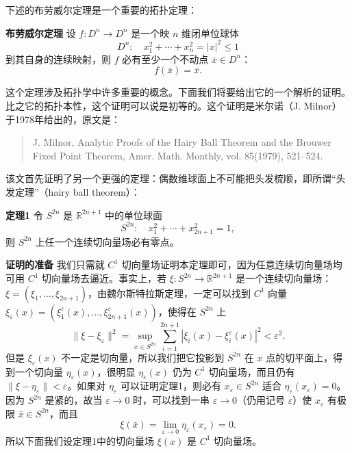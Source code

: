 下述的布劳威尔定理是一个重要的拓扑定理：

\noindent\textbf{布劳威尔定理}\quad
设 $f:D^n\to D^n$ 是一个映 $n$ 维闭单位球体
\begin{equation}
 D^n:\quad x_1^2+\cdots+x_n^2=|x|^2\le1
 \tag{1}
\end{equation}
到其自身的连续映射，则 $f$ 必有至少一个不动点 $\bar x\in D^n$：
\[
 f(\bar x)=\bar x.
\]

这个定理涉及拓扑学中许多重要的概念。下面我们将要给出它的一个解析的证明。比之它的拓扑本性，这个证明可以说是初等的。这个证明是米尔诺（J. Milnor）于1978年给出的，原文是：

\begin{quote}\small
J. Milnor, Analytic Proofs of the Hairy Ball Theorem and the Brouwer Fixed Point Theorem, Amer. Math. Monthly, vol. 85(1979), 521--524.
\end{quote}

该文首先证明了另一个更强的定理：偶数维球面上不可能把头发梳顺，即所谓“头发定理”（hairy ball theorem）：

\noindent\textbf{定理1}\quad
令 $S^{2n}$ 是 $\mathbb R^{2n+1}$ 中的单位球面
\begin{equation}
 S^{2n}:\quad x_1^2+\cdots+x_{2n+1}^2=1,
 \tag{2}
\end{equation}
则 $S^{2n}$ 上任一个连续切向量场必有零点。

\noindent\textbf{证明的准备}\quad
我们只需就 $C^1$ 切向量场证明本定理即可，因为任意连续切向量场均可用 $C^1$ 切向量场去逼近。事实上，若 $\xi:S^{2n}\to\mathbb R^{2n+1}$ 是一个连续切向量场：$\xi=(\xi_1,\ldots,\xi_{2n+1})$，由魏尔斯特拉斯定理，一定可以找到 $C^1$ 向量 $\xi_\varepsilon(x)=(\xi_1^\varepsilon(x),\ldots,\xi_{2n+1}^\varepsilon(x))$，使得在 $S^{2n}$ 上
\[
 \|\xi-\xi_\varepsilon\|^2=
 \sup_{x\in S^{2n}}\sum_{i=1}^{2n+1}|\xi_i(x)-\xi_i^\varepsilon(x)|^2<\varepsilon^2.
\]
但是 $\xi_\varepsilon(x)$ 不一定是切向量，所以我们把它投影到 $S^{2n}$ 在 $x$ 点的切平面上，得到一个切向量 $\eta_\varepsilon(x)$，很明显 $\eta_\varepsilon(x)$ 仍为 $C^1$ 切向量场，而且仍有 $\|\xi-\eta_\varepsilon\|<\varepsilon$。如果对 $\eta_\varepsilon$ 可以证明定理1，则必有 $x_\varepsilon\in S^{2n}$ 适合 $\eta_\varepsilon(x_\varepsilon)=0$。因为 $S^{2n}$ 是紧的，故当 $\varepsilon\to0$ 时，可以找到一串 $\varepsilon\to0$（仍用记号 $\varepsilon$）使 $x_\varepsilon$ 有极限 $\bar x\in S^{2n}$，而且
\[
 \xi(\bar x)=\lim_{\varepsilon\to0}\eta_\varepsilon(x_\varepsilon)=0.
\]
所以下面我们设定理1中的切向量场 $\xi(x)$ 是 $C^1$ 切向量场。

